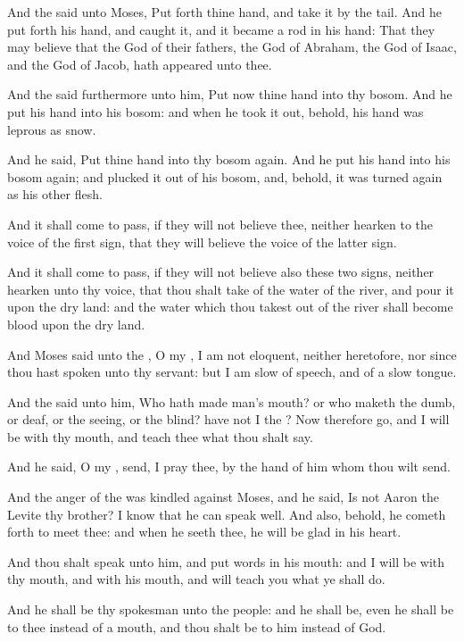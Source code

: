 \verse And the \LORD said unto Moses, Put forth thine hand, and take it by
the tail. And he put forth his hand, and caught it, and it became a
rod in his hand: \verse That they may believe that the \LORD God of their
fathers, the God of Abraham, the God of Isaac, and the God of Jacob,
hath appeared unto thee.

\verse And the \LORD said furthermore unto him, Put now thine hand into
thy bosom. And he put his hand into his bosom: and when he took it
out, behold, his hand was leprous as snow.

\verse And he said, Put thine hand into thy bosom again. And he put his
hand into his bosom again; and plucked it out of his bosom, and,
behold, it was turned again as his other flesh.

\verse And it shall come to pass, if they will not believe thee, neither
hearken to the voice of the first sign, that they will believe the
voice of the latter sign.

\verse And it shall come to pass, if they will not believe also these two
signs, neither hearken unto thy voice, that thou shalt take of the
water of the river, and pour it upon the dry land: and the water which
thou takest out of the river shall become blood upon the dry land.

\verse And Moses said unto the \LORD, O my \LORD, I am not eloquent,
neither heretofore, nor since thou hast spoken unto thy servant: but I
am slow of speech, and of a slow tongue.

\verse And the \LORD said unto him, Who hath made man's mouth? or who
maketh the dumb, or deaf, or the seeing, or the blind? have not I the
\LORD?  \verse Now therefore go, and I will be with thy mouth, and teach
thee what thou shalt say.

\verse And he said, O my \LORD, send, I pray thee, by the hand of him
whom thou wilt send.

\verse And the anger of the \LORD was kindled against Moses, and he said,
Is not Aaron the Levite thy brother? I know that he can speak well.
And also, behold, he cometh forth to meet thee: and when he seeth
thee, he will be glad in his heart.

\verse And thou shalt speak unto him, and put words in his mouth: and I
will be with thy mouth, and with his mouth, and will teach you what ye
shall do.

\verse And he shall be thy spokesman unto the people: and he shall be,
even he shall be to thee instead of a mouth, and thou shalt be to him
instead of God.

